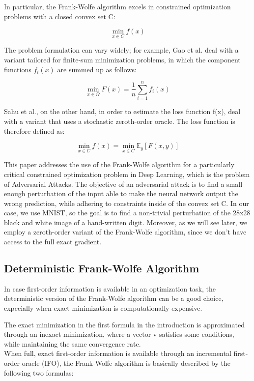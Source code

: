 \documentclass[10pt,twocolumn,letterpaper]{article}
\begin{document}
In particular, the Frank-Wolfe algorithm excels in constrained optimization problems with a closed convex set C:

\[
\min _{x \in C} f(x)
\]

The problem formulation can vary widely; for example, Gao et al. deal with a variant tailored for finite-sum minimization problems, in which
the component functions $ f_{i}(x) $ are summed up as follows:

\[
\min _{x \in \Omega} F(x)=\frac{1}{n} \sum_{i=1}^{n} f_{i}(x)
\]

Sahu et al., on the other hand, in order to estimate the loss function f(x), deal with a variant that uses a stochastic zeroth-order oracle.
The loss function is therefore defined as:

\[
\min _{x \in C} f(x)=\min _{x \in C} \mathbb{E}_{y}[F(x, y)]
\]

This paper addresses the use of the Frank-Wolfe algorithm for a particularly critical constrained optimization problem in Deep Learning, which is the
problem of Adversarial Attacks. The objective of an adversarial attack is to find a small enough perturbation of the input able to make the neural network
output the wrong prediction, while adhering to constraints inside of the convex set C. In our case, we use MNIST, so the goal is to find a non-trivial perturbation of the 28x28 black and white image of a hand-written
digit. Moreover, as we will see later, we employ a zeroth-order variant of the Frank-Wolfe algorithm, since
we don't have access to the full exact gradient.


\subsection{Deterministic Frank-Wolfe Algorithm}

In case first-order information is available in an optimization task, the deterministic version of the Frank-Wolfe algorithm
can be a good choice, expecially when exact minimization is computationally expensive.

The exact minimization in the first formula in the introduction is approximated through an inexact minimization,
where a vector v satisfies some conditions, while maintaining the same convergence rate. \\

When full, exact first-order information is available through an incremental first-order oracle (IFO),
the Frank-Wolfe algorithm is basically described by the following two formulas:
\end{document}
